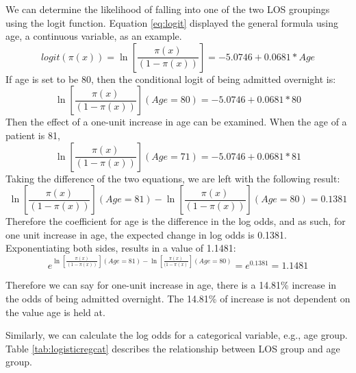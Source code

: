 \documentclass[../thesis.tex]{subfiles}
\begin{document}
We can determine the likelihood of falling into one of the two LOS groupings using the logit function. Equation \ref{eq:logit} displayed the general formula using age, a continuous variable, as an example.
\begin{equation}\label{eq:logit}
    logit(\pi(x)) = \ln\left[ \frac{\pi(x)}{(1-\pi(x))}\right] = -5.0746 +0.0681*Age
\end{equation}
If age is set to be 80, then the conditional logit of being admitted overnight is:
\begin{equation}
    \ln\left[\frac{\pi(x)}{(1-\pi(x))}\right](Age =80) = -5.0746 +0.0681*80 
\end{equation}
Then the effect of a one-unit increase in age can be examined. When the age of a patient is 81,
\begin{equation}
    \ln\left[\frac{\pi(x)}{(1-\pi(x))}\right](Age = 71) = -5.0746 +0.0681*81 
\end{equation}
Taking the difference of the two equations, we are left with the following result:
\begin{equation}
\ln\left[\frac{\pi(x)}{(1-\pi(x))}\right](Age =81) - \ln\left[\frac{\pi(x)}{(1-\pi(x))}\right](Age = 80) = 0.1381
\end{equation}
Therefore the coefficient for age is the difference in the log odds, and as such, for one unit increase in age, the expected change in log odds is 0.1381. Exponentiating both sides, results in a value of 1.1481:
\begin{equation}
    e^{\ln\left[\frac{\pi(x)}{(1-\pi(x))}\right](Age =81) - \ln\left[\frac{\pi(x)}{(1-\pi(x)}\right](Age = 80)} = e^{0.1381} = 1.1481
\end{equation}

Therefore we can say for one-unit increase in age, there is a 14.81\% increase in the odds of being admitted overnight. The 14.81\% of increase is not dependent on the value age is held at.


Similarly, we can calculate the log odds for a categorical variable, e.g., age group. Table \ref{tab:logisticregcat} describes the relationship between LOS group and age group.
\end{document}
